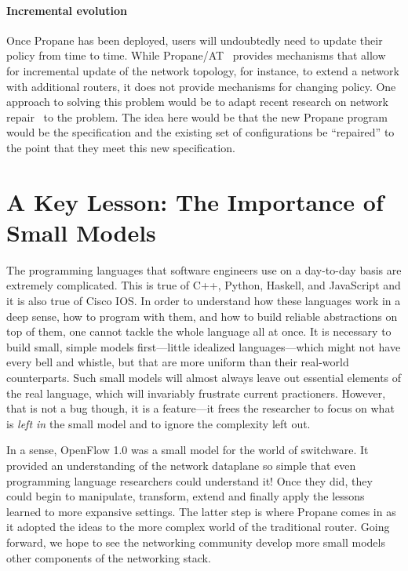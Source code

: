 \documentclass[10pt]{sigalternate052015}
\begin{document}
\paragraph*{Incremental evolution}
Once Propane has been deployed, users will undoubtedly need to update
their policy from time to time.  While
Propane/AT~\cite{abstract-propane} provides mechanisms that allow for
incremental update of the network topology, for instance, to extend a
network with additional routers, it does not provide mechanisms for
changing policy.  One approach to solving this problem would be to
adapt recent research on network repair~\cite{Gember-Jacobson:SOSP17}
to the problem.  The idea here would be that the new Propane
program would be the specification and the existing set of
configurations be ``repaired'' to the point that they meet this new specification.

\section{A Key Lesson:  The Importance of Small Models}
\label{sec:conclusions}

The programming languages that software engineers use on a day-to-day
basis are extremely complicated.  This is true of C++, Python, Haskell, and
JavaScript and it is also true of Cisco IOS.  In order to understand
how these languages work in a deep sense, how to program with them,
and how to build reliable abstractions on top of them, one cannot
tackle the whole language all at once.  It is necessary to build
small, simple models first---little idealized languages---which might
not have every bell and whistle, but that are more uniform than their
real-world counterparts.  Such
small models will almost always leave out essential elements of the
real language, which will invariably frustrate current practioners.
However, that is
not a bug though, it is a feature---it frees the researcher to focus on
what is \emph{left in} the small model and to ignore the complexity left out.

In a sense, OpenFlow 1.0 was a small model for the world of
switchware.  It provided an understanding of the network dataplane so
simple that even programming language researchers could understand it!
Once they did, they could begin to manipulate, transform, extend and
finally apply the lessons learned to more expansive settings.  The
latter step is where Propane comes in as it adopted the ideas to the
more complex world of the traditional router.  Going forward, we hope
to see the networking community develop more small models other
components of the networking stack.
\end{document}
